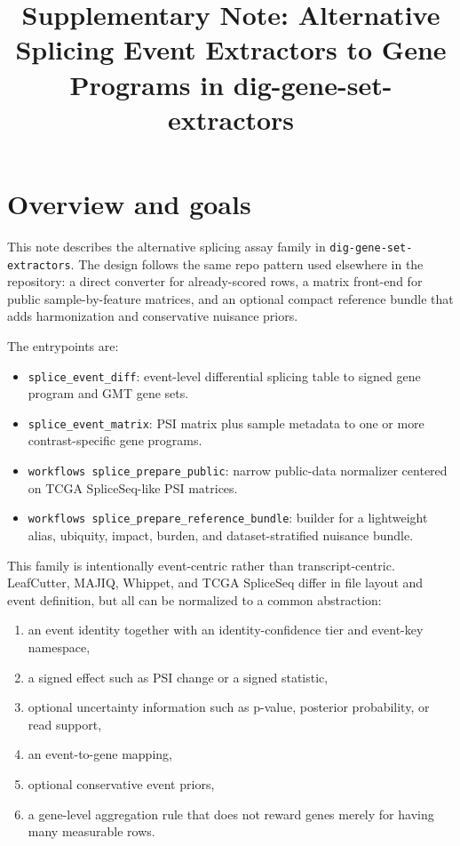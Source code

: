 \documentclass[11pt]{article}
\title{Supplementary Note: Alternative Splicing Event Extractors to Gene Programs in dig-gene-set-extractors}
\author{}
\date{}
\begin{document}
\maketitle

\section*{Overview and goals}
This note describes the alternative splicing assay family in \texttt{dig-gene-set-extractors}. The design follows the same repo pattern used elsewhere in the repository: a direct converter for already-scored rows, a matrix front-end for public sample-by-feature matrices, and an optional compact reference bundle that adds harmonization and conservative nuisance priors.

The entrypoints are:
\begin{itemize}[leftmargin=2em]
\item \texttt{splice\_event\_diff}: event-level differential splicing table to signed gene program and GMT gene sets.
\item \texttt{splice\_event\_matrix}: PSI matrix plus sample metadata to one or more contrast-specific gene programs.
\item \texttt{workflows splice\_prepare\_public}: narrow public-data normalizer centered on TCGA SpliceSeq-like PSI matrices.
\item \texttt{workflows splice\_prepare\_reference\_bundle}: builder for a lightweight alias, ubiquity, impact, burden, and dataset-stratified nuisance bundle.
\end{itemize}

This family is intentionally event-centric rather than transcript-centric. LeafCutter, MAJIQ, Whippet, and TCGA SpliceSeq differ in file layout and event definition, but all can be normalized to a common abstraction:
\begin{enumerate}[leftmargin=2em]
\item an event identity together with an identity-confidence tier and event-key namespace,
\item a signed effect such as PSI change or a signed statistic,
\item optional uncertainty information such as p-value, posterior probability, or read support,
\item an event-to-gene mapping,
\item optional conservative event priors,
\item a gene-level aggregation rule that does not reward genes merely for having many measurable rows.
\end{enumerate}
\end{document}
